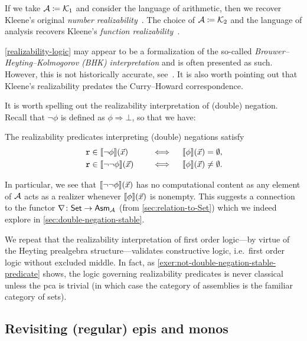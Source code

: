 If we take \(\AA \coloneqq \Kone\) and consider the language of arithmetic, then
we recover Kleene's original \emph{number realizability}~\cite{Kleene1945}.
%
The choice of \(\AA \coloneqq \Ktwo\) and the language of analysis recovers
Kleene's \emph{function realizability}~\cite{KleeneVesley1965}.
%

\cref{realizability-logic} may appear to be a formalization of the so-called
\emph{Brouwer--Heyting--Kolmogorov (BHK) interpretation} and is often presented
as such. However, this is not historically accurate,
see~\cite[p.~241]{vanOosten2002}. It is also worth pointing out that Kleene's
realizability predates the Curry--Howard correspondence.


It is worth spelling out the realizability interpretation of (double) negation.
%
Recall that \(\lnot\phi\) is defined as \(\phi \Rightarrow \bot\), so that we
have:
\begin{lemma}%
  The realizability predicates interpreting (double) negations satisfy
  \begin{alignat*}{2}
    &\pca{r} \in \sem{\lnot\phi}(\vec x) &&\quad\iff\quad
    \sem{\phi}(\vec x) = \emptyset, \\
    &\pca{r} \in \sem{\lnot\lnot\phi}(\vec x) &&\quad\iff\quad
    \sem{\phi}(\vec x) \neq \emptyset.
  \end{alignat*}
\end{lemma}

In particular, we see that \(\sem{\lnot\lnot\phi}(\vec x)\) has no computational
content as any element of \(\AA\) acts as a realizer whenever
\(\sem{\phi}(\vec x)\) is nonempty.
%
This suggests a connection to the functor \(\nabla \colon \Set \to \Asm{\AA}\)
(from \cref{sec:relation-to-Set}) which we indeed explore in
\cref{sec:double-negation-stable}.

We repeat that the realizability interpretation of first order logic---by virtue
of the Heyting prealgebra structure---validates constructive logic, i.e.\ first
order logic without excluded middle.
%
In fact, as \cref{exer:not-double-negation-stable-predicate} shows, the logic
governing realizability predicates is never classical unless the pca is
trivial (in which case the category of assemblies is the familiar category of
sets).

\subsection{Revisiting (regular) epis and monos}\label{sec:revisiting-epis-monos}

